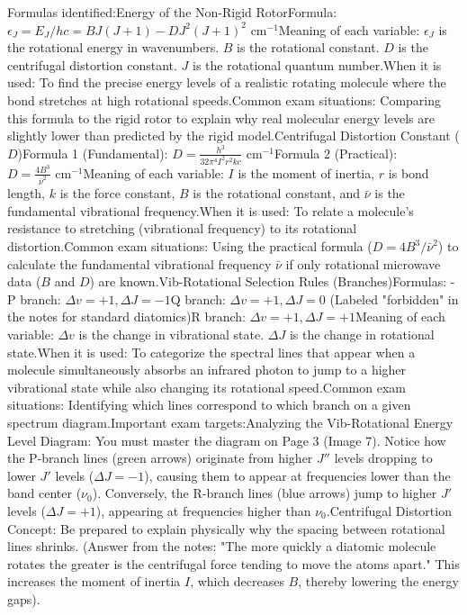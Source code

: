 \documentclass[11pt, a4paper]{report}
\begin{document}
Formulas identified:Energy of the Non-Rigid RotorFormula: $\epsilon_J = E_J / hc = BJ(J+1) - DJ^2(J+1)^2 \text{ cm}^{-1}$Meaning of each variable: $\epsilon_J$ is the rotational energy in wavenumbers. $B$ is the rotational constant. $D$ is the centrifugal distortion constant. $J$ is the rotational quantum number.When it is used: To find the precise energy levels of a realistic rotating molecule where the bond stretches at high rotational speeds.Common exam situations: Comparing this formula to the rigid rotor to explain why real molecular energy levels are slightly lower than predicted by the rigid model.Centrifugal Distortion Constant ($D$)Formula 1 (Fundamental): $D = \frac{h^3}{32\pi^4 I^2 r^2 kc} \text{ cm}^{-1}$Formula 2 (Practical): $D = \frac{4B^3}{\bar{\nu}^2} \text{ cm}^{-1}$Meaning of each variable: $I$ is the moment of inertia, $r$ is bond length, $k$ is the force constant, $B$ is the rotational constant, and $\bar{\nu}$ is the fundamental vibrational frequency.When it is used: To relate a molecule's resistance to stretching (vibrational frequency) to its rotational distortion.Common exam situations: Using the practical formula ($D = 4B^3 / \bar{\nu}^2$) to calculate the fundamental vibrational frequency $\bar{\nu}$ if only rotational microwave data ($B$ and $D$) are known.Vib-Rotational Selection Rules (Branches)Formulas: - P branch: $\Delta v = +1, \Delta J = -1$Q branch: $\Delta v = +1, \Delta J = 0$ (Labeled "forbidden" in the notes for standard diatomics)R branch: $\Delta v = +1, \Delta J = +1$Meaning of each variable: $\Delta v$ is the change in vibrational state. $\Delta J$ is the change in rotational state.When it is used: To categorize the spectral lines that appear when a molecule simultaneously absorbs an infrared photon to jump to a higher vibrational state while also changing its rotational speed.Common exam situations: Identifying which lines correspond to which branch on a given spectrum diagram.Important exam targets:Analyzing the Vib-Rotational Energy Level Diagram: You must master the diagram on Page 3 (Image 7). Notice how the P-branch lines (green arrows) originate from higher $J''$ levels dropping to lower $J'$ levels ($\Delta J = -1$), causing them to appear at frequencies lower than the band center ($\nu_0$). Conversely, the R-branch lines (blue arrows) jump to higher $J'$ levels ($\Delta J = +1$), appearing at frequencies higher than $\nu_0$.Centrifugal Distortion Concept: Be prepared to explain physically why the spacing between rotational lines shrinks. (Answer from the notes: "The more quickly a diatomic molecule rotates the greater is the centrifugal force tending to move the atoms apart." This increases the moment of inertia $I$, which decreases $B$, thereby lowering the energy gaps).
\end{document}
